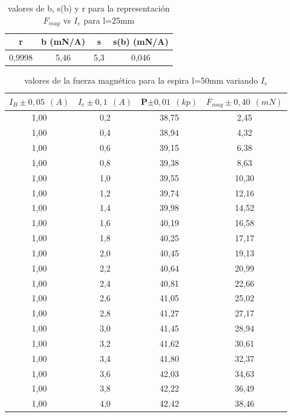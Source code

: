 \documentclass[12pt,a4paper]{book}
\begin{document}
\begin{table}[h!]
\begin{center}
\begin{tabular}{|c|c|c|c|}
\hline
r & 	 b  (mN/A) & 	 s & 	 s(b)  (mN/A) \\ \hline
0,9998 & 	 5,46 & 	 5,3 & 	 0,046 \\
\hline
\end{tabular}
\end{center}
\caption{valores de b, s(b) y r para la representación $F_{mag}$ vs $I_e$ para l=25mm}
\end{table} 

\newpage


\vspace*{2.5cm} 


\begin{table}[h!]
\begin{center}
\begin{tabular}{|c|c|c|c|}
\hline
$I_B  \pm 0,05 \ \  (A)$ & 	 $I_e \pm 0,1 \ \ (A) $ & 	 P$\pm 0,01\ \ (kp)$ & 	 $F_{mag} \pm 0,40 \ \ (mN)$ \\ \hline
1,00 & 	 0,2 & 	 38,75 & 	 2,45 \\ 
1,00 & 	 0,4 & 	 38,94 & 	 4,32 \\ 
1,00 & 	 0,6 & 	 39,15 & 	 6,38 \\ 
1,00 & 	 0,8 & 	 39,38 & 	 8,63 \\ 
1,00 & 	 1,0 & 	 39,55 & 	 10,30 \\ 
1,00 & 	 1,2 & 	 39,74 & 	 12,16 \\ 
1,00 & 	 1,4 & 	 39,98 & 	 14,52 \\ 
1,00 & 	 1,6 & 	 40,19 & 	 16,58 \\ 
1,00 & 	 1,8 & 	 40,25 & 	 17,17 \\ 
1,00 & 	 2,0 & 	 40,45 & 	 19,13 \\ 
1,00 & 	 2,2 & 	 40,64 & 	 20,99 \\ 
1,00 & 	 2,4 & 	 40,81 & 	 22,66 \\ 
1,00 & 	 2,6 & 	 41,05 & 	 25,02 \\ 
1,00 & 	 2,8 & 	 41,27 & 	 27,17 \\ 
1,00 & 	 3,0 & 	 41,45 & 	 28,94 \\ 
1,00 & 	 3,2 & 	 41,62 & 	 30,61 \\ 
1,00 & 	 3,4 & 	 41,80 & 	 32,37 \\ 
1,00 & 	 3,6 & 	 42,03 & 	 34,63 \\ 
1,00 & 	 3,8 & 	 42,22 & 	 36,49 \\ 
1,00 & 	 4,0 & 	 42,42 & 	 38,46 \\ 
\hline
\end{tabular}
\end{center}
\caption{valores de la fuerza magnética para la espira l=50mm variando $I_e$}
\end{table}
\end{document}
